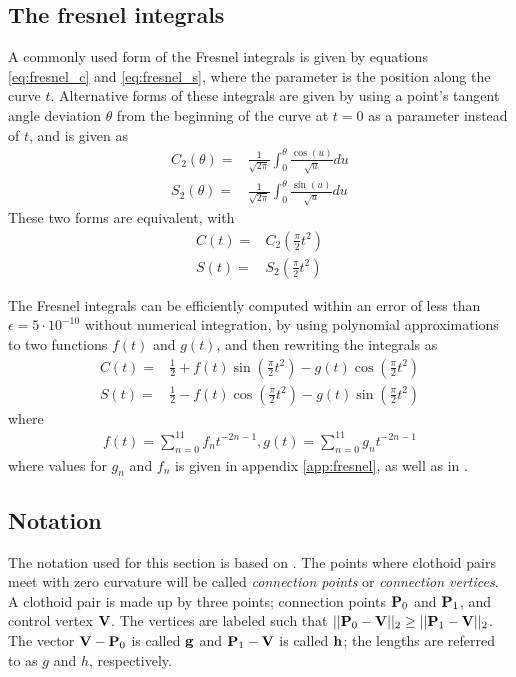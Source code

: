 \subsection{The fresnel integrals}
A commonly used form of the Fresnel integrals is given by equations \ref{eq:fresnel_c} and \ref{eq:fresnel_s}, where the parameter is the position along the curve $t$. Alternative forms of these integrals are given by using a point's tangent angle deviation $\theta$ from the beginning of the curve at $t=0$ as a parameter instead of $t$, and is given as\cite{clothoid}\cite{mathhandbook}
\begin{align}
C_2(\theta) =& \frac{1}{\sqrt{2\pi} }\int_0^\theta \frac{\cos(u)}{\sqrt{u}} du\label{eq:fresnel_c2}\\
S_2(\theta) =& \frac{1}{\sqrt{2\pi} }\int_0^\theta \frac{\sin(u)}{\sqrt{u}} du\label{eq:fresnel_s2}
\end{align}
These two forms are equivalent, with\cite{mathhandbook}
\begin{align}
C(t) =& C_2\left(\frac{\pi}{2}t^2\right)\\
S(t) =& S_2\left(\frac{\pi}{2}t^2\right)
\end{align}

The Fresnel integrals can be efficiently computed within an error of less than $\epsilon = 5\cdot 10^{-10}$ without numerical integration, by using polynomial approximations to two functions $f(t)$ and $g(t)$, and then rewriting the integrals as\cite{fresnel}
\begin{align}
C(t) =& \frac{1}{2} + f(t)\sin\left(\frac{\pi}{2}t^2\right) - g(t)\cos\left(\frac{\pi}{2}t^2\right)\\
S(t) =& \frac{1}{2} - f(t)\cos\left(\frac{\pi}{2}t^2\right) - g(t)\sin\left(\frac{\pi}{2}t^2\right)
\end{align}
where
\begin{align}
f(t) = \sum_{n=0}^{11} f_nt^{-2n-1}, g(t) = \sum_{n=0}^{11} g_nt^{-2n-1}
\end{align}
where values for $g_n$ and $f_n$ is given in appendix \ref{app:fresnel}, as well as in \cite{fresnel}. 

\subsection{Notation}
The notation used for this section is based on \cite{clothoid}. The points where clothoid pairs meet with zero curvature will be called \textit{connection points} or \textit{connection vertices}. A clothoid pair is made up by three points; connection points ${\mathbf P}_0$ and ${\mathbf P}_1$, and control vertex ${\mathbf V}$. The vertices are labeled such that $||{\mathbf P}_0-{\mathbf V}||_2 \geq ||{\mathbf P}_1-{\mathbf V}||_2$. The vector ${\mathbf V} - {\mathbf P}_0$ is called ${\mathbf g}$ and ${\mathbf P}_1-{\mathbf V}$ is called ${\mathbf h}$; the lengths are referred to as $g$ and $h$, respectively.

